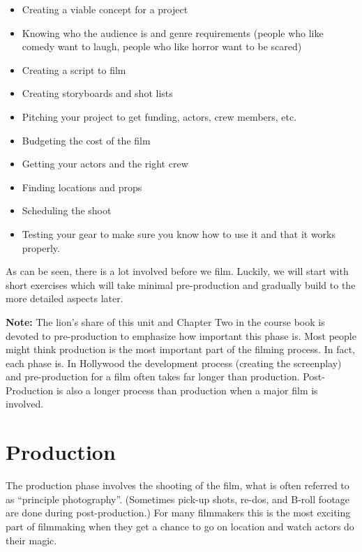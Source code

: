 \documentclass[
]{book}
\providecommand{\tightlist}{%
  \setlength{\itemsep}{0pt}\setlength{\parskip}{0pt}}
\begin{document}
\begin{itemize}
\tightlist
\item
  Creating a viable concept for a project\\
\item
  Knowing who the audience is and genre requirements (people who like comedy want to laugh, people who like horror want to be scared)\\
\item
  Creating a script to film\\
\item
  Creating storyboards and shot lists\\
\item
  Pitching your project to get funding, actors, crew members, etc.\\
\item
  Budgeting the cost of the film\\
\item
  Getting your actors and the right crew\\
\item
  Finding locations and props\\
\item
  Scheduling the shoot\\
\item
  Testing your gear to make sure you know how to use it and that it works properly.
\end{itemize}

As can be seen, there is a lot involved before we film. Luckily, we will start with short exercises which will take minimal pre-production and gradually build to the more detailed aspects later.

\textbf{Note:} The lion's share of this unit and Chapter Two in the course book is devoted to pre-production to emphasize how important this phase is. Most people might think production is the most important part of the filming process. In fact, each phase is. In Hollywood the development process (creating the screenplay) and pre-production for a film often takes far longer than production. Post-Production is also a longer process than production when a major film is involved.

\hypertarget{production}{%
\section*{Production}\label{production}}

The production phase involves the shooting of the film, what is often referred to as ``principle photography''. (Sometimes pick-up shots, re-dos, and B-roll footage are done during post-production.) For many filmmakers this is the most exciting part of filmmaking when they get a chance to go on location and watch actors do their magic.
\end{document}
